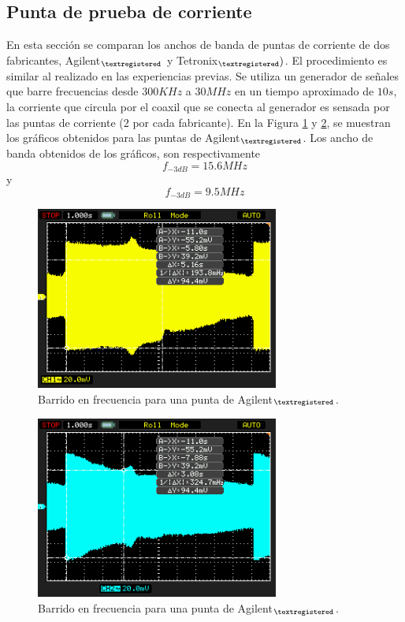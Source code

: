\documentclass[a4paper,10pt]{article}
\begin{document}
		\subsection{Punta de prueba de corriente}
		En esta secci\'on se comparan los anchos de banda de puntas de corriente de dos fabricantes, Agilent$_{\textregistered}$  y Tetronix$_{\textregistered} )$.
		El procedimiento es similar al realizado en las experiencias previas. Se utiliza un generador de se\~nales que barre frecuencias desde $300KHz$ a $30MHz$ en un tiempo aproximado de $10s$, la corriente que circula por el coaxil que se conecta al generador es sensada por las puntas de corriente (2 por cada fabricante). En la Figura \ref{img004} y \ref{img005}, se muestran los gr\'aficos obtenidos para las puntas de Agilent$_{\textregistered}$. Los ancho de banda obtenidos de los gr\'aficos, son respectivamente $$f_{-3dB}=15.6MHz$$ y $$f_{-3dB}=9.5MHz$$
		\begin{figure}[!htb]
			\centering
			\includegraphics[width=8cm]{Imagenes/Mediciones instrumentos/NewFile5.png}
			\caption{Barrido en frecuencia para una punta de Agilent$_{\textregistered}$.} \label{img004}
		\end{figure}
		
		\begin{figure}[!htb]
			\centering
			\includegraphics[width=8cm]{Imagenes/Mediciones instrumentos/NewFile6.png}
			\caption{Barrido en frecuencia para una punta de Agilent$_{\textregistered}$.} \label{img005}
		\end{figure}				
		
\end{document}
